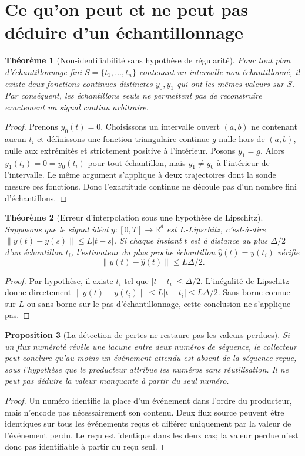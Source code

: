 \documentclass[11pt,oneside]{book}
\newtheorem{theoreme}{Théorème}[chapter]
\newtheorem{proposition}[theoreme]{Proposition}
\theoremstyle{definition}
\theoremstyle{remark}
\newcommand{\R}{\mathbb R}
\newcommand{\1}{\mathbf 1}
\newcommand{\norm}[1]{\left\lVert #1\right\rVert}
\begin{document}
\section{Ce qu'on peut et ne peut pas déduire d'un échantillonnage}
\begin{theoreme}[Non-identifiabilité sans hypothèse de régularité]
Pour tout plan d'échantillonnage fini $S=\{t_1,\ldots,t_n\}$ contenant un intervalle non échantillonné, il existe deux fonctions continues distinctes $y_0,y_1$ qui ont les mêmes valeurs sur $S$. Par conséquent, les échantillons seuls ne permettent pas de reconstruire exactement un signal continu arbitraire.
\end{theoreme}
\begin{proof}
Prenons $y_0(t)=0$. Choisissons un intervalle ouvert $(a,b)$ ne contenant aucun $t_i$ et définissons une fonction triangulaire continue $g$ nulle hors de $(a,b)$, nulle aux extrémités et strictement positive à l'intérieur. Posons $y_1=g$. Alors $y_1(t_i)=0=y_0(t_i)$ pour tout échantillon, mais $y_1\neq y_0$ à l'intérieur de l'intervalle. Le même argument s'applique à deux trajectoires dont la sonde mesure ces fonctions. Donc l'exactitude continue ne découle pas d'un nombre fini d'échantillons.
\end{proof}

\begin{theoreme}[Erreur d'interpolation sous une hypothèse de Lipschitz]
Supposons que le signal idéal $y:[0,T]\to\R^d$ est $L$-Lipschitz, c'est-à-dire $\norm{y(t)-y(s)}\leq L|t-s|$. Si chaque instant $t$ est à distance au plus $\Delta/2$ d'un échantillon $t_i$, l'estimateur du plus proche échantillon $\widehat y(t)=y(t_i)$ vérifie
\[
\norm{y(t)-\widehat y(t)}\leq L\Delta/2.
\]
\end{theoreme}
\begin{proof}
Par hypothèse, il existe $t_i$ tel que $|t-t_i|\leq\Delta/2$. L'inégalité de Lipschitz donne directement $\norm{y(t)-y(t_i)}\leq L|t-t_i|\leq L\Delta/2$. Sans borne connue sur $L$ ou sans borne sur le pas d'échantillonnage, cette conclusion ne s'applique pas.
\end{proof}

\begin{proposition}[La détection de pertes ne restaure pas les valeurs perdues]
Si un flux numéroté révèle une lacune entre deux numéros de séquence, le collecteur peut conclure qu'au moins un événement attendu est absent de la séquence reçue, sous l'hypothèse que le producteur attribue les numéros sans réutilisation. Il ne peut pas déduire la valeur manquante à partir du seul numéro.
\end{proposition}
\begin{proof}
Un numéro identifie la place d'un événement dans l'ordre du producteur, mais n'encode pas nécessairement son contenu. Deux flux source peuvent être identiques sur tous les événements reçus et différer uniquement par la valeur de l'événement perdu. Le reçu est identique dans les deux cas; la valeur perdue n'est donc pas identifiable à partir du reçu seul.
\end{proof}
\end{document}
